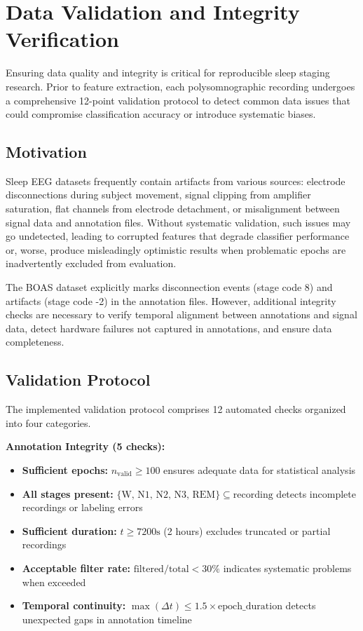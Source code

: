 \documentclass{imc-inf} %
\begin{document}
\section{Data Validation and Integrity Verification}
\label{sec:data_validation}

Ensuring data quality and integrity is critical for reproducible sleep staging research. Prior to feature extraction, each polysomnographic recording undergoes a comprehensive 12-point validation protocol to detect common data issues that could compromise classification accuracy or introduce systematic biases.

\subsection{Motivation}

Sleep EEG datasets frequently contain artifacts from various sources: electrode disconnections during subject movement, signal clipping from amplifier saturation, flat channels from electrode detachment, or misalignment between signal data and annotation files. Without systematic validation, such issues may go undetected, leading to corrupted features that degrade classifier performance or, worse, produce misleadingly optimistic results when problematic epochs are inadvertently excluded from evaluation.

The BOAS dataset explicitly marks disconnection events (stage code 8) and artifacts (stage code -2) in the annotation files. However, additional integrity checks are necessary to verify temporal alignment between annotations and signal data, detect hardware failures not captured in annotations, and ensure data completeness.

\subsection{Validation Protocol}

The implemented validation protocol comprises 12 automated checks organized into four categories.

\textbf{Annotation Integrity (5 checks):}
\begin{itemize}
\item \textbf{Sufficient epochs:} $n_{\text{valid}} \geq 100$ ensures adequate data for statistical analysis
\item \textbf{All stages present:} $\{\text{W, N1, N2, N3, REM}\} \subseteq \text{recording}$ detects incomplete recordings or labeling errors
\item \textbf{Sufficient duration:} $t \geq 7200\text{s}$ (2 hours) excludes truncated or partial recordings
\item \textbf{Acceptable filter rate:} $\text{filtered}/\text{total} < 30\%$ indicates systematic problems when exceeded
\item \textbf{Temporal continuity:} $\max(\Delta t) \leq 1.5 \times \text{epoch\_duration}$ detects unexpected gaps in annotation timeline
\end{itemize}
\end{document}
